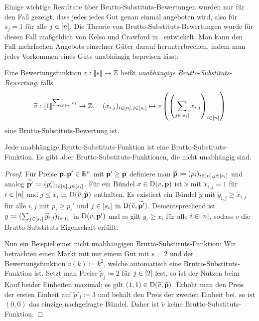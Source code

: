 Einige wichtige Resultate über Brutto-Substituts-Bewertungen wurden nur für den Fall gezeigt, dass jedes jedes Gut genau einmal angeboten wird, also für $s_j = 1$ für alle $j\in\left[ n \right]$.
Die Theorie von Brutto-Substituts-Bewertungen wurde für diesen Fall maßgeblich von Kelso und Crawford in~\cite{KelsoCrawford} entwickelt.
Man kann den Fall mehrfachen Angebots einzelner Güter darauf herunterbrechen, indem man jedes Vorkommen eines Guts unabhängig bepreisen lässt:
\newcommand{\tild}[1]{\widetilde{#1}}
\begin{definition}
	Eine Bewertungsfunktion $v: \left\llbracket s \right\rrbracket \rightarrow \mathbb{Z}$ heißt \emph{unabhängige Brutto-Substituts-Bewertung}, falls \[
	\tild{v}: \ffirst{1}^{\sum_{i\in\first{n}}s_i} \rightarrow \Z,
	\quad (x_{i,j})_{i\in\first{n}, j\in\first{s_i}} \mapsto v\left( \left( \sum_{j\in\first{s_i}} x_{i,j} \right)_{i\in\first{n}} \right)
	\]
	eine Brutto-Substituts-Bewertung ist.
\end{definition}
\begin{proposition}
	Jede unabhängige Brutto-Substituts-Funktion ist eine Brutto-Substituts-Funktion.
	Es gibt aber Brutto-Substituts-Funktionen, die nicht unabhängig sind.
\end{proposition}
\begin{proof}
	Für Preise $\mathbf{p},\mathbf{p}'\in\mathbb{R}^n$ mit $\mathbf{p}' \geq \mathbf{p}$ definiere man $\tild{\fp}\coloneqq (p_i)_{i\in\first{n},j\in\first{s_i}}$ und analog $\tild{\fp'}\coloneqq (p_i')_{i\in\first{n},j\in\first{s_i}}$.
	Für ein Bündel $x\in\operatorname{D}(v,\mathbf{p})$ ist $\tild{x}$ mit $\tild{x}_{i,j} = 1$ für $i\in\left[ n \right]$ und $j\leq x_i$ in $\NB(\tild{v}, \tild{\fp})$ enthalten.
	Es existiert ein Bündel $\tild{y}$ mit $\tild{y}_{i,j} \geq \tild{x}_{i,j}$ für alle $i,j$ mit $p_i \geq p_i'$ und $j\in\left[ s_i \right]$ in $\NB(\tild{v}, \tild{\fp'})$.
	Dementsprechend ist $y\coloneqq(\sum_{j\in\first{s_i}} \tild{y}_{i,j})_{i\in\first{n}}$ in $\operatorname{D}(v, \mathbf{p}')$ und es gilt $y_i \geq x_i$ für alle $i\in\left[ n \right]$, sodass $v$ die Brutto-Substituts-Eigenschaft erfüllt.
	
	Nun ein Beispiel einer nicht unabhängigen Brutto-Substituts-Funktion: Wir betrachten einen Markt mit nur einem Gut mit $s=2$ und der Bewertungsfunktion $v(k)\coloneqq k^2$, welche automatisch eine Brutto-Substituts-Funktion ist.
	Setzt man Preise $\tild{p}_j \coloneqq 2$ für $j\in\left[ 2 \right]$ fest,
	so ist der Nutzen beim Kauf beider Einheiten maximal; es gilt $(1,1)\in \NB(\tild{v}, \tild{\fp})$.
	Erhöht man den Preis der ersten Einheit auf $\tild{p}'_1 \coloneqq 3$ und behält den Preis der zweiten Einheit bei, so ist $(0,0)$ das einzige nachgefragte Bündel.
	Daher ist $\tilde{v}$ keine Brutto-Substituts-Funktion.
\end{proof}


